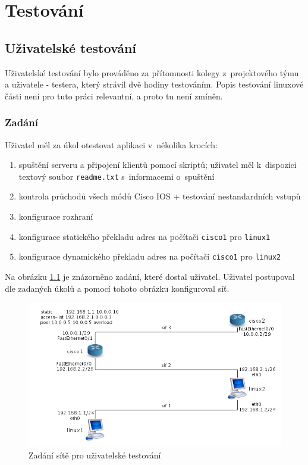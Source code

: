 \chapter{Testování}


\section{Uživatelské testování}
Uživatelské testování bylo prováděno za přítomnosti kolegy z~projektového týmu a uživatele - testera, který strávil dvě hodiny testováním. Popis testování linuxové části není pro tuto práci relevantní, a proto tu není zmíněn.

\subsection{Zadání}
Uživatel měl za úkol otestovat aplikaci v~několika krocích:
\begin{enumerate}
 \item spuštění serveru a připojení klientů pomocí skriptů; uživatel měl k~dispozici textový soubor \verb|readme.txt| s~informacemi o~spuštění
 \item kontrola průchodů všech módů Cisco IOS + testování nestandardních vstupů
 \item konfigurace rozhraní
 \item konfigurace statického překladu adres na počítači \verb|cisco1| pro \verb|linux1|
 \item konfigurace dynamického překladu adres na počítači \verb|cisco1| pro \verb|linux2|
\end{enumerate}

Na obrázku \ref{fig:testovani} je znázorněno zadání, které dostal uživatel. Uživatel postupoval dle zadaných úkolů a pomocí tohoto obrázku konfiguroval síť.

\begin{figure}[h]
\begin{center}
\includegraphics[width=15cm]{figures/testovani}
\caption{Zadání sítě pro uživatelské testování}
\label{fig:testovani}
\end{center}
\end{figure}


